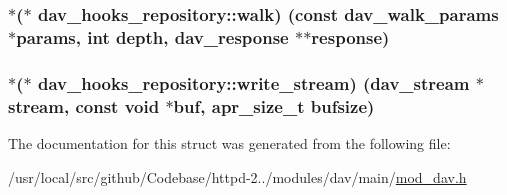 \subsubsection[{\texorpdfstring{walk}{walk}}]{$\ast$($\ast$ dav\+\_\+hooks\+\_\+repository\+::walk) (const {\bf dav\+\_\+walk\+\_\+params} $\ast${\bf params}, {\bf int} {\bf depth}, {\bf dav\+\_\+response} $\ast$$\ast${\bf response})}\hypertarget{structdav__hooks__repository_a2b96b1b50859933db39ec1831656e006}{}\label{structdav__hooks__repository_a2b96b1b50859933db39ec1831656e006}
\subsubsection[{\texorpdfstring{write\+\_\+stream}{write_stream}}]{$\ast$($\ast$ dav\+\_\+hooks\+\_\+repository\+::write\+\_\+stream) ({\bf dav\+\_\+stream} $\ast$stream, const {\bf void} $\ast${\bf buf}, {\bf apr\+\_\+size\+\_\+t} {\bf bufsize})}\hypertarget{structdav__hooks__repository_a99e80fcf2f29776d5e59403fb428b35a}{}\label{structdav__hooks__repository_a99e80fcf2f29776d5e59403fb428b35a}


The documentation for this struct was generated from the following file\+:\begin{DoxyCompactItemize}
\item 
/usr/local/src/github/\+Codebase/httpd-\/2../modules/dav/main/\hyperlink{mod__dav_8h}{mod\+\_\+dav.\+h}\end{DoxyCompactItemize}
